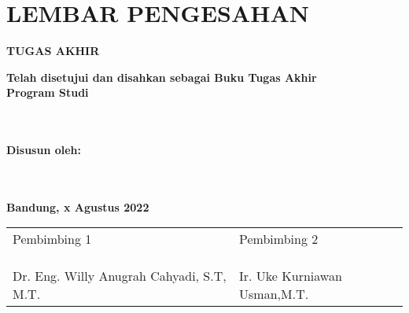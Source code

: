 \chapter*{LEMBAR PENGESAHAN} %


\begin{center} %
	\large
	\textbf{TUGAS AKHIR}
	\bigskip
	
	\Large
	\textbf{\JUDUL}
	\bigskip
	
	\textbf{\textit{\JUDULENG}}
	\bigskip
	\bigskip
	\bigskip
	
	\normalsize
	\textbf{Telah disetujui dan disahkan sebagai Buku Tugas Akhir}\\
	\textbf{Program Studi \prodi}\\
	\textbf{\fakultas}\\
	\textbf{\universitas}\\
	\bigskip
	\bigskip
	
	\textbf{Disusun oleh:}\\
	\textbf{\PENULIS}\\
	\textbf{\nim}\\
	\bigskip
	\bigskip
	
	\textbf{Bandung, x Agustus 2022}\\
	\begin{tabular}{|p{6cm}|p{6cm}|}
		\hline
		Pembimbing 1 & Pembimbing 2 \\
		& \\
		& \\
		& \\
		Dr. Eng. Willy Anugrah Cahyadi, S.T, M.T. & Ir. Uke Kurniawan Usman,M.T. \\
		\hline
	\end{tabular}
\end{center}

